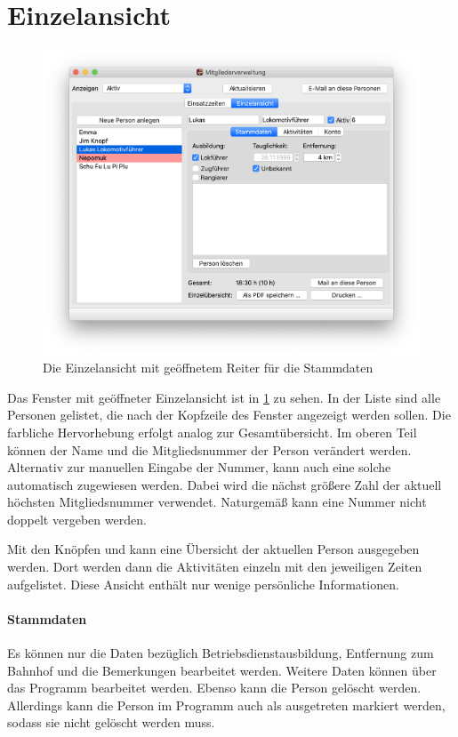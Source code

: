\section{Einzelansicht}\label{einsatz:personal:einzelansicht}
\begin{figure}[!h]
	\includegraphics[width=\textwidth]{img/einzelansicht_stammdaten}
	\caption{Die Einzelansicht mit geöffnetem Reiter für die Stammdaten}
	\label{fig:einsatz:personal:einzel:stammdaten}
\end{figure}
Das Fenster mit geöffneter Einzelansicht ist in \cref{fig:einsatz:personal:einzel:stammdaten} zu sehen.
In der Liste sind alle Personen gelistet, die nach der Kopfzeile des Fenster angezeigt werden sollen.
Die farbliche Hervorhebung erfolgt analog zur Gesamtübersicht.
Im oberen Teil können der Name und die Mitgliedsnummer der Person verändert werden.
Alternativ zur manuellen Eingabe der Nummer,
kann auch eine solche automatisch zugewiesen werden.
Dabei wird die nächst größere Zahl der aktuell höchsten Mitgliedsnummer verwendet.
Naturgemäß kann eine Nummer nicht doppelt vergeben werden.

Mit den Knöpfen  und  kann eine Übersicht der aktuellen Person ausgegeben werden.
Dort werden dann die Aktivitäten einzeln mit den jeweiligen Zeiten aufgelistet.
Diese Ansicht enthält nur wenige persönliche Informationen.


\paragraph{Stammdaten}
Es können nur die Daten bezüglich Betriebsdienstausbildung, Entfernung zum Bahnhof und die Bemerkungen bearbeitet werden.
Weitere Daten können über das Programm \Personal bearbeitet werden.
Ebenso kann die Person gelöscht werden.
Allerdings kann die Person im Programm \Personal auch als ausgetreten markiert werden, sodass sie nicht gelöscht werden muss.

